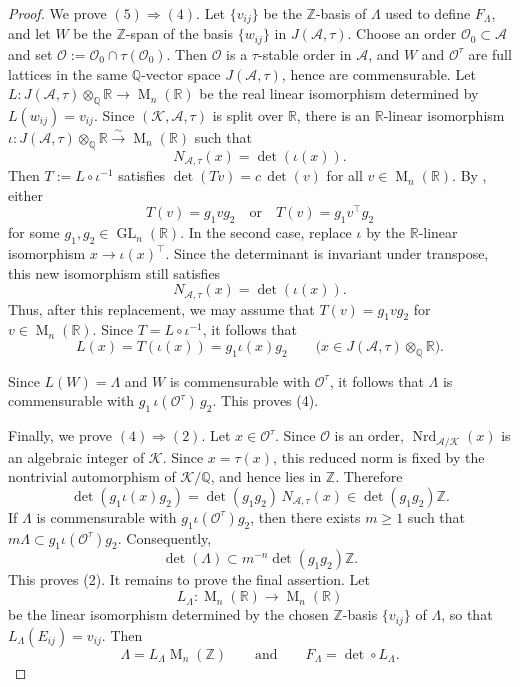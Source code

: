 \documentclass[reqno,11pt]{amsart}
\numberwithin{equation}{section}
\theoremstyle{definition}
\theoremstyle{remark}
\newcommand{\op}{\operatorname}
\newcommand{\M}{\op{M}}
\newcommand{\GL}{\op{GL}}
\begin{document}
\begin{proof}
We prove $(5)\Rightarrow(4)$. Let $\{v_{ij}\}$ be the
$\mathbb Z$-basis of $\Lambda$ used to define $F_\Lambda$, and let
$W$ be the $\mathbb Z$-span of the basis $\{w_{ij}\}$ in
$J(\mathscr{A},\tau)$. Choose an order $\mathcal O_0\subset\mathscr A$ and
set $\mathcal O:=\mathcal O_0\cap\tau(\mathcal O_0)$. Then $\mathcal O$ is
a $\tau$-stable order in $\mathscr A$, and $W$ and $\mathcal O^\tau$ are full lattices in the same
$\mathbb Q$-vector space $J(\mathscr{A},\tau)$, hence are commensurable. Let $ L:J(\mathscr{A},\tau)\otimes_{\mathbb Q}\mathbb R\to \M_n(\mathbb R)$
be the real linear isomorphism determined by
$L(w_{ij})=v_{ij}$. Since $(\mathscr K,\mathscr A,\tau)$ is split over $\mathbb R$, there is
an $\mathbb R$-linear isomorphism
$\iota:J(\mathscr A,\tau)\otimes_{\mathbb Q}\mathbb R
\xrightarrow{\sim}\M_n(\mathbb R)$
such that
$$
N_{\mathscr A,\tau}(x)=\det(\iota(x)).
$$
Then $T:=L\circ\iota^{-1}$ satisfies
$\det(Tv)=c\,\det(v)$ for all $v\in\M_n(\mathbb R)$.
By , either
$$
    T(v)=g_1vg_2\quad\text{or}\quad
    T(v)=g_1v^{\intercal}g_2
$$
for some $g_1,g_2\in\GL_n(\mathbb R)$.  In the second case, replace
$\iota$ by the $\mathbb R$-linear isomorphism
$x\to \iota(x)^{\intercal}$.
Since the determinant is invariant under transpose, this new isomorphism
still satisfies
$$
N_{\mathscr A,\tau}(x)=\det(\iota(x)).
$$ Thus, after this replacement, we may assume that
$
T(v)=g_1vg_2$ for $v\in\M_n(\mathbb R)$.
Since $T=L\circ\iota^{-1}$, it follows that
$$
L(x)=T(\iota(x))=g_1\iota(x)g_2
\qquad
\bigl(x\in J(\mathscr A,\tau)\otimes_{\mathbb Q}\mathbb R\bigr).
$$

Since $L(W)=\Lambda$ and $W$ is commensurable with $\mathcal O^\tau$,
it follows that $\Lambda$ is commensurable with
$g_1\,\iota(\mathcal O^\tau)\,g_2$. This proves (4).

Finally, we prove $(4)\Rightarrow(2)$. Let $x\in\mathcal O^\tau$.
Since $\mathcal O$ is an order, $\operatorname{Nrd}_{\mathscr{A}/\mathscr{K}}(x)$ is an
algebraic integer of $\mathscr{K}$. Since $x=\tau(x)$, this reduced norm is fixed
by the nontrivial automorphism of $\mathscr{K}/\mathbb Q$, and hence lies in
$\mathbb Z$. Therefore
$$
    \det(g_1\iota(x)g_2)
    =
    \det(g_1g_2)\,N_{\mathscr{A},\tau}(x)
    \in
    \det(g_1g_2)\mathbb Z.
$$
If $\Lambda$ is commensurable with $g_1\iota(\mathcal O^\tau)g_2$, then
there exists $m\ge1$ such that $m\Lambda\subset g_1\iota(\mathcal O^\tau)g_2$. Consequently,
$$
    \det(\Lambda)
    \subset
    m^{-n}\det(g_1g_2)\mathbb Z.
$$
This proves (2).
It remains to prove the final assertion. Let
$$
L_\Lambda:\M_n(\mathbb R)\to\M_n(\mathbb R)
$$
be the linear isomorphism determined by the chosen
$\mathbb Z$-basis $\{v_{ij}\}$ of $\Lambda$, so that
$L_\Lambda(E_{ij})=v_{ij}$. Then
$$
\Lambda=L_\Lambda\M_n(\mathbb Z)
\qquad\text{and}\qquad
F_\Lambda=\det\circ L_\Lambda.
$$


\end{proof}
\end{document}
